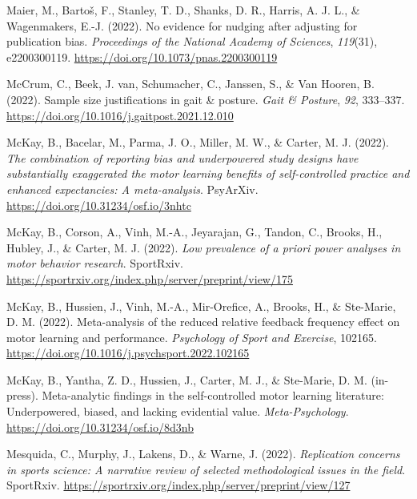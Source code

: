 \documentclass[
  doc, donotrepeattitle,floatsintext]{apa7}
\newlength{\cslhangindent}
\newlength{\cslentryspacingunit} %
\newenvironment{CSLReferences}[2] %
 {%
  \setlength{\parindent}{0pt}
  \ifodd #1
  \let\oldpar\par
  \def\par{\hangindent=\cslhangindent\oldpar}
  \fi
  \setlength{\parskip}{#2\cslentryspacingunit}
 }%
 {}
\begin{document}
\begin{CSLReferences}{1}{0}
\leavevmode{}%
Maier, M., Bartoš, F., Stanley, T. D., Shanks, D. R., Harris, A. J. L., \& Wagenmakers, E.-J. (2022). No evidence for nudging after adjusting for publication bias. \emph{Proceedings of the National Academy of Sciences}, \emph{119}(31), e2200300119. \url{https://doi.org/10.1073/pnas.2200300119}

\leavevmode{}%
McCrum, C., Beek, J. van, Schumacher, C., Janssen, S., \& Van Hooren, B. (2022). Sample size justifications in gait \& posture. \emph{Gait \& Posture}, \emph{92}, 333--337. \url{https://doi.org/10.1016/j.gaitpost.2021.12.010}

\leavevmode{}%
McKay, B., Bacelar, M., Parma, J. O., Miller, M. W., \& Carter, M. J. (2022). \emph{The combination of reporting bias and underpowered study designs have substantially exaggerated the motor learning benefits of self-controlled practice and enhanced expectancies: A meta-analysis}. PsyArXiv. \url{https://doi.org/10.31234/osf.io/3nhtc}

\leavevmode{}%
McKay, B., Corson, A., Vinh, M.-A., Jeyarajan, G., Tandon, C., Brooks, H., Hubley, J., \& Carter, M. J. (2022). \emph{Low prevalence of a priori power analyses in motor behavior research}. SportRxiv. \url{https://sportrxiv.org/index.php/server/preprint/view/175}

\leavevmode{}%
McKay, B., Hussien, J., Vinh, M.-A., Mir-Orefice, A., Brooks, H., \& Ste-Marie, D. M. (2022). Meta-analysis of the reduced relative feedback frequency effect on motor learning and performance. \emph{Psychology of Sport and Exercise}, 102165. \url{https://doi.org/10.1016/j.psychsport.2022.102165}

\leavevmode{}%
McKay, B., Yantha, Z. D., Hussien, J., Carter, M. J., \& Ste-Marie, D. M. (in-press). Meta-analytic findings in the self-controlled motor learning literature: Underpowered, biased, and lacking evidential value. \emph{Meta-Psychology}. \url{https://doi.org/10.31234/osf.io/8d3nb}

\leavevmode{}%
Mesquida, C., Murphy, J., Lakens, D., \& Warne, J. (2022). \emph{Replication concerns in sports science: A narrative review of selected methodological issues in the field}. SportRxiv. \url{https://sportrxiv.org/index.php/server/preprint/view/127}


\end{CSLReferences}
\end{document}
